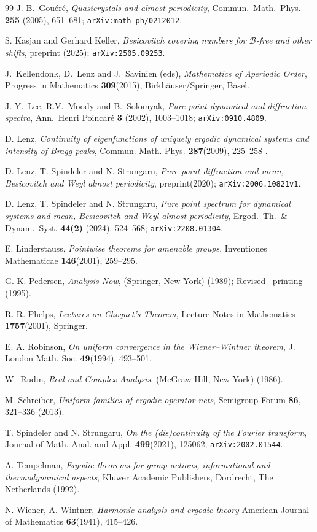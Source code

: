 \documentclass [14pt]{amsart}
\numberwithin{equation}{section}
\begin{document}
\begin{thebibliography}{99}
J.-B.~Gou\'{e}r\'{e}, \textit{Quasicrystals and almost periodicity},
{Commun.\ Math.\ Phys.} \textbf{255} (2005), 651--681;
\texttt{arXiv:math-ph/0212012}.


S. Kasjan and Gerhard Keller, \textit{Besicovitch covering numbers for $\mathcal{B}$-free and other shifts},
preprint (2025); \texttt{arXiv:2505.09253}.

 J.~Kellendonk, D.~Lenz and J.~Savinien (eds), \textit{Mathematics of Aperiodic Order},
Progress in Mathematics \textbf{309}(2015), Birkh\"auser/Springer, Basel.

J.-Y.~Lee, R.V.~Moody and B.~Solomyak, \textit{Pure point dynamical and
diffraction spectra}, {Ann.\ Henri Poincar\'e} \textbf{3}
(2002), 1003--1018; \texttt{arXiv:0910.4809}.



D. Lenz,
\textit{Continuity of eigenfunctions of uniquely ergodic dynamical systems and intensity of Bragg peaks}, Commun. Math. Phys. \textbf{287}(2009), 225--258 .


D. Lenz, T. Spindeler and N. Strungaru, \textit{
Pure point diffraction and mean, Besicovitch and Weyl almost
periodicity}, preprint(2020); \texttt{arXiv:2006.10821v1}.


D. Lenz, T. Spindeler and N. Strungaru, \textit{Pure point spectrum
for dynamical systems and mean, Besicovitch and Weyl almost
periodicity}, Ergod.\ Th.\ \& Dynam.\ Syst. \textbf{44(2)} (2024), 524--568; \texttt{arXiv:2208.01304}.

E. Linderstauss,
\textit{Pointwise theorems for amenable groups}, Inventiones Mathematicae \textbf{146}(2001), 259--295.

G. K. Pedersen, \textit{Analysis Now}, (Springer, New York) (1989);
Revised \ printing (1995).

R. R. Phelps,
\textit{Lectures on Choquet's Theorem},
Lecture Notes in Mathematics \textbf{1757}(2001), Springer.


E. A. Robinson, \textit{On uniform convergence in the Wiener--Wintner theorem}, J. London Math. Soc. \textbf{49}(1994),
493--501.

 W.~Rudin, {\em Real and Complex Analysis},
(McGraw-Hill, New York) (1986).

 M. Schreiber, \textit{Uniform families of ergodic operator nets}, Semigroup Forum \textbf{86}, 321--336 (2013).

T. Spindeler and N. Strungaru,  \textit{
On the (dis)continuity of the Fourier transform}, Journal of Math. Anal. and Appl. \textbf{499}(2021), 125062;
\texttt{arXiv:2002.01544}.

A. Tempelman,
\textit{Ergodic theorems for group actions, informational and thermodynamical
aspects}, Kluwer Academic Publishers, Dordrecht, The Netherlands (1992).


N. Wiener, A. Wintner, \textit{Harmonic analysis and ergodic theory}
American Journal of Mathematics \textbf{63}(1941), 415--426.

\end{thebibliography}
\end{document}
